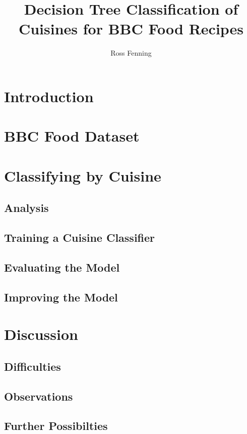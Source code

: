 \documentclass[11pt,twoside,a4paper]{article}
\title{Decision Tree Classification of Cuisines for BBC Food Recipes}
\author{Ross Fenning}
\begin{document}
\maketitle

\section{Introduction}

\section{BBC Food Dataset}

\section{Classifying by Cuisine}
\subsection{Analysis}
\subsection{Training a Cuisine Classifier}
\subsection{Evaluating the Model}
\subsection{Improving the Model}

\section{Discussion}
\subsection{Difficulties}
\subsection{Observations}
\subsection{Further Possibilties}
\end{document}
